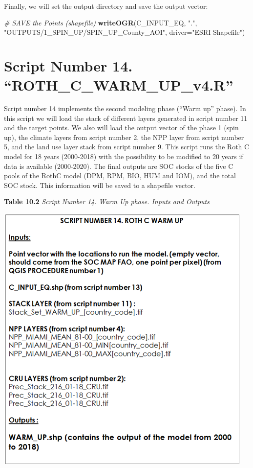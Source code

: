 \documentclass[
  10pt,
  b5paper,
]{book}
\newenvironment{Shaded}{\begin{snugshade}}{\end{snugshade}}
\newcommand{\CommentTok}[1]{\textcolor[rgb]{0.56,0.35,0.01}{\textit{#1}}}
\newcommand{\DataTypeTok}[1]{\textcolor[rgb]{0.13,0.29,0.53}{#1}}
\newcommand{\KeywordTok}[1]{\textcolor[rgb]{0.13,0.29,0.53}{\textbf{#1}}}
\newcommand{\NormalTok}[1]{#1}
\newcommand{\StringTok}[1]{\textcolor[rgb]{0.31,0.60,0.02}{#1}}
\begin{document}
Finally, we will set the output directory and save the output vector:

\begin{Shaded}
\begin{Highlighting}[]
 \CommentTok{# SAVE the Points (shapefile)}
\KeywordTok{writeOGR}\NormalTok{(C_INPUT_EQ, }\StringTok{"."}\NormalTok{, }\StringTok{"OUTPUTS/1_SPIN_UP/SPIN_UP_County_AOI"}\NormalTok{, }\DataTypeTok{driver=}\StringTok{"ESRI Shapefile"}\NormalTok{) }
\end{Highlighting}
\end{Shaded}

\hypertarget{script-number-14.-roth_c_warm_up_v4.r}{%
\section{Script Number 14. ``ROTH\_C\_WARM\_UP\_v4.R''}\label{script-number-14.-roth_c_warm_up_v4.r}}

Script number 14 implements the second modeling phase (``Warm up'' phase). In this script we will load the stack of different layers generated in script number 11 and the target points. We also will load the output vector of the phase 1 (spin up), the climate layers from script number 2, the NPP layer from script number 5, and the land use layer stack from script number 9. This script runs the Roth C model for 18 years (2000-2018) with the possibility to be modified to 20 years if data is available (2000-2020). The final outputs are SOC stocks of the five C pools of the RothC model (DPM, RPM, BIO, HUM and IOM), and the total SOC stock. This information will be saved to a shapefile vector.

\textbf{Table 10.2} \emph{Script Number 14. Warm Up phase. Inputs and Outputs}

\includegraphics{tables/Table_10.2.png}
\end{document}
